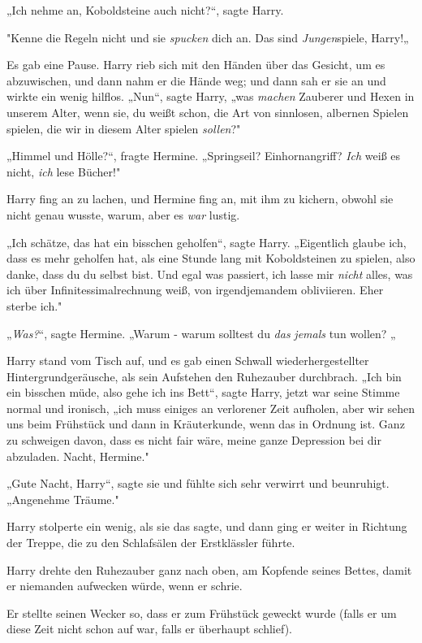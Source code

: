 {„Ich nehme an, Koboldsteine auch nicht?“, sagte Harry.

"Kenne die Regeln nicht und sie \emph{spucken} dich an. Das sind \emph{Jungen}spiele, Harry!„

Es gab eine Pause. Harry rieb sich mit den Händen über das Gesicht, um es abzuwischen, und dann nahm er die Hände weg; und dann sah er sie an und wirkte ein wenig hilflos. „Nun“, sagte Harry, „was \emph{machen} Zauberer und Hexen in unserem Alter, wenn sie, du weißt schon, die Art von sinnlosen, albernen Spielen spielen, die wir in diesem Alter spielen \emph{sollen}?"

„Himmel und Hölle?“, fragte Hermine. „Springseil? Einhornangriff? \emph{Ich} weiß es nicht, \emph{ich} lese Bücher!"

Harry fing an zu lachen, und Hermine fing an, mit ihm zu kichern, obwohl sie nicht genau wusste, warum, aber es \emph{war} lustig.

„Ich schätze, das hat ein bisschen geholfen“, sagte Harry. „Eigentlich glaube ich, dass es mehr geholfen hat, als eine Stunde lang mit Koboldsteinen zu spielen, also danke, dass du du selbst bist. Und egal was passiert, ich lasse mir \emph{nicht} alles, was ich über Infinitessimalrechnung weiß, von irgendjemandem obliviieren. Eher sterbe ich."

„\emph{Was?}“, sagte Hermine. „Warum - warum solltest du \emph{das} \emph{jemals} tun wollen? „

Harry stand vom Tisch auf, und es gab einen Schwall wiederhergestellter Hintergrundgeräusche, als sein Aufstehen den Ruhezauber durchbrach. „Ich bin ein bisschen müde, also gehe ich ins Bett“, sagte Harry, jetzt war seine Stimme normal und ironisch, „ich muss einiges an verlorener Zeit aufholen, aber wir sehen uns beim Frühstück und dann in Kräuterkunde, wenn das in Ordnung ist. Ganz zu schweigen davon, dass es nicht fair wäre, meine ganze Depression bei dir abzuladen. Nacht, Hermine."

„Gute Nacht, Harry“, sagte sie und fühlte sich sehr verwirrt und beunruhigt. „Angenehme Träume."

Harry stolperte ein wenig, als sie das sagte, und dann ging er weiter in Richtung der Treppe, die zu den Schlafsälen der Erstklässler führte.

Harry drehte den Ruhezauber ganz nach oben, am Kopfende seines Bettes, damit er niemanden aufwecken würde, wenn er schrie.

Er stellte seinen Wecker so, dass er zum Frühstück geweckt wurde (falls er um diese Zeit nicht schon auf war, falls er überhaupt schlief).

}
